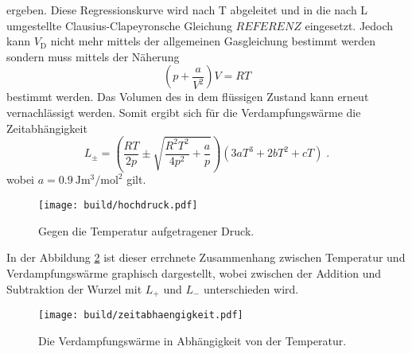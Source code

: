 ergeben.
Diese Regressionskurve wird nach T abgeleitet und in die nach L umgestellte Clausius-Clapeyronsche Gleichung $REFERENZ$ eingesetzt.
Jedoch kann $V_\text{D}$ nicht mehr mittels der allgemeinen Gasgleichung bestimmt werden sondern muss mittels der Näherung
\begin{equation*}
    \left( p + \frac{a}{V^2}\right) V = RT
\end{equation*}
bestimmt werden.
Das Volumen des in dem flüssigen Zustand kann erneut vernachlässigt werden.
Somit ergibt sich für die Verdampfungswärme die Zeitabhängigkeit
\begin{equation*}
    L_\pm = \left( \frac{RT}{2p} \pm \sqrt{\frac{R^2T^2}{4p^2} + \frac{a}{p}}\right)\left( 3aT^3 + 2bT^2 + cT \right) \; \text{.}
\end{equation*} 
wobei $a = \SI{0.9}{\joule\metre\tothe{3}\per\mole\squared}$ gilt.
\begin{figure}
    \centering
    \caption{Gegen die Temperatur aufgetragener Druck.}
    \label{fig:hochdruck}
    \texttt{[image: build/hochdruck.pdf]}
\end{figure}
In der Abbildung \ref{fig:Zeitabhaengigkeit} ist dieser errchnete Zusammenhang zwischen Temperatur und Verdampfungswärme graphisch dargestellt, wobei zwischen der Addition und 
Subtraktion der Wurzel mit $L_+$ und $L_-$ unterschieden wird.
\begin{figure}
    \centering
    \caption{Die Verdampfungswärme in Abhängigkeit von der Temperatur.}
    \label{fig:Zeitabhaengigkeit}
    \texttt{[image: build/zeitabhaengigkeit.pdf]}
\end{figure}